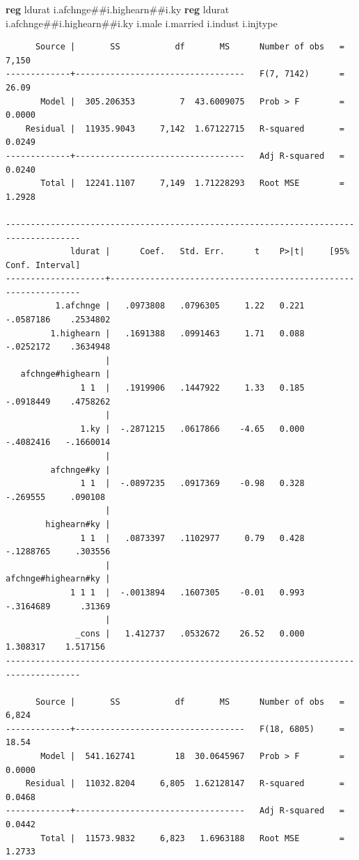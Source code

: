 \documentclass[
]{book}
\newenvironment{Shaded}{\begin{snugshade}}{\end{snugshade}}
\newcommand{\KeywordTok}[1]{\textcolor[rgb]{0.13,0.29,0.53}{\textbf{#1}}}
\newcommand{\NormalTok}[1]{#1}
\begin{document}
\begin{Shaded}
\begin{Highlighting}[]
\KeywordTok{reg}\NormalTok{ ldurat i.afchnge\#\#i.highearn\#\#i.ky }
\KeywordTok{reg}\NormalTok{ ldurat i.afchnge\#\#i.highearn\#\#i.ky i.male i.married i.indust i.injtype}
\end{Highlighting}
\end{Shaded}

\begin{verbatim}
      Source |       SS           df       MS      Number of obs   =     7,150
-------------+----------------------------------   F(7, 7142)      =     26.09
       Model |  305.206353         7  43.6009075   Prob > F        =    0.0000
    Residual |  11935.9043     7,142  1.67122715   R-squared       =    0.0249
-------------+----------------------------------   Adj R-squared   =    0.0240
       Total |  12241.1107     7,149  1.71228293   Root MSE        =    1.2928

-------------------------------------------------------------------------------------
             ldurat |      Coef.   Std. Err.      t    P>|t|     [95% Conf. Interval]
--------------------+----------------------------------------------------------------
          1.afchnge |   .0973808   .0796305     1.22   0.221    -.0587186    .2534802
         1.highearn |   .1691388   .0991463     1.71   0.088    -.0252172    .3634948
                    |
   afchnge#highearn |
               1 1  |   .1919906   .1447922     1.33   0.185    -.0918449    .4758262
                    |
               1.ky |  -.2871215   .0617866    -4.65   0.000    -.4082416   -.1660014
                    |
         afchnge#ky |
               1 1  |  -.0897235   .0917369    -0.98   0.328     -.269555     .090108
                    |
        highearn#ky |
               1 1  |   .0873397   .1102977     0.79   0.428    -.1288765     .303556
                    |
afchnge#highearn#ky |
             1 1 1  |  -.0013894   .1607305    -0.01   0.993    -.3164689      .31369
                    |
              _cons |   1.412737   .0532672    26.52   0.000     1.308317    1.517156
-------------------------------------------------------------------------------------

      Source |       SS           df       MS      Number of obs   =     6,824
-------------+----------------------------------   F(18, 6805)     =     18.54
       Model |  541.162741        18  30.0645967   Prob > F        =    0.0000
    Residual |  11032.8204     6,805  1.62128147   R-squared       =    0.0468
-------------+----------------------------------   Adj R-squared   =    0.0442
       Total |  11573.9832     6,823   1.6963188   Root MSE        =    1.2733


\end{verbatim}
\end{document}
